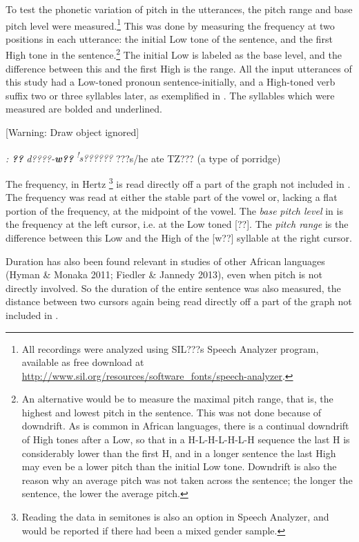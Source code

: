 \documentclass[output=paper]{langsci/langscibook}
\begin{document}
To test the phonetic variation of pitch in the utterances, the pitch range and base pitch level were measured.\footnote{ All recordings were analyzed using SIL???s Speech Analyzer program, available as free download at \url{http://www.sil.org/resources/software_fonts/speech-analyzer}.} This was done by measuring the frequency at two positions in each utterance: the initial Low tone of the sentence, and the first High tone in the sentence.\footnote{ An alternative would be to measure the maximal pitch range, that is, the highest and lowest pitch in the sentence. This was not done because of downdrift. As is common in African languages, there is a continual downdrift of High tones after a Low, so that in a H-L-H-L-H-L-H sequence the last H is considerably lower than the first H, and in a longer sentence the last High may even be a lower pitch than the initial Low tone. Downdrift is also the reason why an average pitch was not taken across the sentence; the longer the sentence, the lower the average pitch.} The initial Low is labeled as the base level, and the difference between this and the first High is the range. All the input utterances of this study had a Low-toned pronoun sentence-initially, and a High-toned verb suffix two or three syllables later, as exemplified in . The syllables which were measured are bolded and underlined.

[Warning: Draw object ignored]

  
 

\emph{\textup{:}}  \emph{\textbf{??}}\emph{\textbf{ }}\emph{  d????-}\emph{\textbf{w??}}\emph{  }\textit{\textsuperscript{!}}\emph{s??????}  ???s/he ate TZ???    (a type of porridge)

The frequency, in Hertz \footnote{ Reading the data in semitones is also an option in Speech Analyzer, and would be reported if there had been a mixed gender sample.} is read directly off a part of the graph not included in . The frequency was read at either the stable part of the vowel or, lacking a flat portion of the frequency, at the midpoint of the vowel.  The \emph{base} \emph{pitch level} in  is the frequency at the left cursor, i.e. at the Low toned [??]. The \emph{pitch range} is the difference between this Low and the High of the [w??] syllable at the right cursor. 

Duration has also been found relevant in studies of other African languages (Hyman \& Monaka 2011; Fiedler \& Jannedy 2013), even when pitch is not directly involved. So the duration of the entire sentence was also measured, the distance between two cursors again being read directly off a part of the graph not included in .
\end{document}
